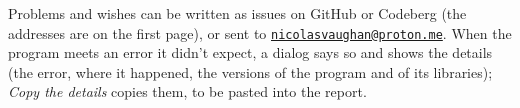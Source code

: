 \documentclass[12pt,
              article,
              oneside
              ]{memoir}
\newcommand*{\menu}[1]{\textit{#1}}
\begin{document}
\noindent{}%
Problems and wishes can be written as issues on GitHub or
Codeberg (the addresses are on the first page), or sent to
\href{mailto:nicolasvaughan@proton.me}{\texttt{nicolasvaughan@proton.me}}.
When the program meets an error it didn't expect, a dialog says so and
shows the details (the error, where it happened, the versions of the
program and of its libraries); \menu{Copy the details} copies them, to be
pasted into the report.

\printindex
\end{document}

